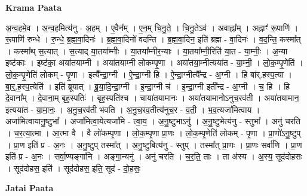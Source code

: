 \documentclass[17pt]{extarticle}
\begin{document}
\textbf{Krama Paata} \newline

अ॒न्व॒हमे॒व । अ॒न्व॒हमित्य॑नु - अ॒हम् । ए॒वैन᳚म् । ए॒न॒म् चि॒नु॒ते॒ । चि॒नु॒तेऽव॑ । अवाह्ना᳚म् । अह्नाꣳ॑ रू॒पाणि॑ । रू॒पाणि॑ रुन्धे । रु॒न्धे॒ ब्र॒ह्म॒वा॒दिनः॑ । ब्र॒ह्म॒वा॒दिनो॑ वदन्ति । ब्र॒ह्म॒वा॒दिन॒ इति॑ ब्रह्म - वा॒दिनः॑ । व॒द॒न्ति॒ कस्मा᳚त् । कस्मा᳚थ् स॒त्यात् । स॒त्याद् या॒तया᳚म्नीः । या॒तया᳚म्नीर॒न्याः । या॒तया᳚म्नी॒रिति॑ या॒त - या॒म्नीः॒ । अ॒न्या इष्ट॑काः । इष्ट॑का॒ अया॑तयाम्नी । अया॑तयाम्नी लोकम्पृ॒णा । अया॑तया॒म्नीत्यया॑त - या॒म्नी॒ । लो॒क॒म्पृ॒णेति॑ । लो॒क॒म्पृ॒णेति॑ लोकम् - पृ॒णा । इत्यै᳚न्द्रा॒ग्नी । ऐ॒न्द्रा॒ग्नी हि । ऐ॒न्द्रा॒ग्नीत्यै᳚न्द्र - अ॒ग्नी । हि बा॑र्.हस्प॒त्या । बा॒र्॒.ह॒स्प॒त्येति॑ । इति॑ ब्रूयात् । ब्रू॒या॒दि॒न्द्रा॒ग्नी । इ॒न्द्रा॒ग्नी च॑ । इ॒न्द्रा॒ग्नी इती᳚न्द्र - अ॒ग्नी । च॒ हि । हि दे॒वाना᳚म् । दे॒वाना॒म् बृह॒स्पतिः॑ । बृह॒स्पति॑श्च । चाया॑तयामानः । अया॑तयामानोऽनुच॒रव॑ती । अया॑तयामान॒ इत्यया॑त - या॒मा॒नः॒ । अ॒नु॒च॒रव॑ती भवति । अ॒नु॒च॒रव॒तीत्य॑नुच॒र - व॒ती॒ । भ॒व॒त्यजा॑मित्वाय । अजा॑मित्वायानु॒ष्टुभा᳚ । अजा॑मित्वा॒येत्यजा॑मि - त्वा॒य॒ । अ॒नु॒ष्टुभाऽनु॑ । अ॒नु॒ष्टुभेत्य॑नु - स्तुभा᳚ । अनु॑ चरति । च॒र॒त्या॒त्मा । आ॒त्मा वै । वै लो॑कम्पृ॒णा । लो॒क॒म्पृ॒णा प्रा॒णः । लो॒क॒म्पृ॒णेति॑ लोकम् - पृ॒णा । प्रा॒णो॑ऽनु॒ष्टुप् । प्रा॒ण इति॑ प्र - अ॒नः । अ॒नु॒ष्टुप् तस्मा᳚त् । अ॒नु॒ष्टुबित्य॑नु - स्तुप् । तस्मा᳚त् प्रा॒णः । प्रा॒णः सर्वा॑णि । प्रा॒ण इति॑ प्र - अ॒नः । सर्वा॒ण्यङ्गा॑नि । अङ्गा॒न्यनु॑ । अनु॑ चरति । च॒र॒ति॒ ताः । ता अ॑स्य । 
अ॒स्य॒ सूद॑दोहसः । सूद॑दोहस॒ इति॑ । सूद॑दोहस॒ इति॒ सूद॑ - दो॒ह॒सः॒ \newline

\textbf{Jatai Paata} \newline
\end{document}
